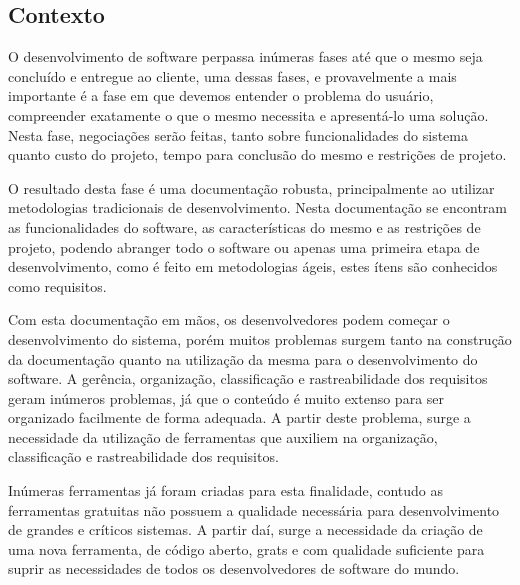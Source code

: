 
\subsection{Contexto} %
\label{sub:contexto}

O desenvolvimento de software perpassa inúmeras fases até que o mesmo seja concluído e entregue ao cliente, uma dessas fases, e provavelmente a mais importante é a fase em que devemos entender o problema do usuário, compreender exatamente o que o mesmo necessita e apresentá-lo uma solução. Nesta fase, negociações serão feitas, tanto sobre funcionalidades do sistema quanto custo do projeto, tempo para conclusão do mesmo e restrições de projeto.
	
O resultado desta fase é uma documentação robusta, principalmente ao utilizar metodologias tradicionais de desenvolvimento. Nesta documentação se encontram as funcionalidades do software, as características do mesmo e as restrições de projeto, podendo abranger todo o software ou apenas uma primeira etapa de desenvolvimento, como é feito em metodologias ágeis, estes ítens são conhecidos como requisitos.

Com esta documentação em mãos, os desenvolvedores podem começar o desenvolvimento do sistema, porém muitos problemas surgem tanto na construção da documentação quanto na utilização da mesma para o desenvolvimento do software. A gerência, organização, classificação e rastreabilidade dos requisitos geram inúmeros problemas, já que o conteúdo é muito extenso para ser organizado facilmente de forma adequada. A partir deste problema, surge a necessidade da utilização de ferramentas que auxiliem na organização, classificação e rastreabilidade dos requisitos.

Inúmeras ferramentas já foram criadas para esta finalidade, contudo as ferramentas gratuitas não possuem a qualidade necessária para desenvolvimento de grandes e críticos sistemas. A partir daí, surge a necessidade da criação de uma nova ferramenta, de código aberto, grats e com qualidade suficiente para suprir as necessidades de todos os desenvolvedores de software do mundo.

